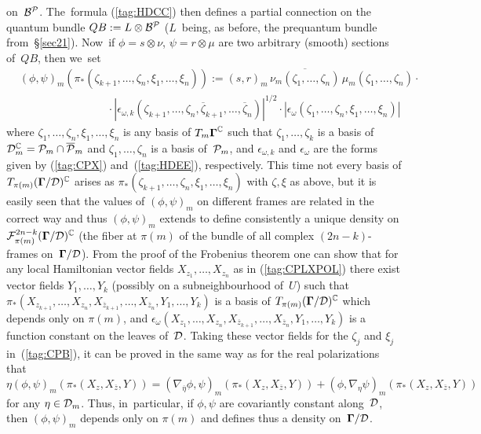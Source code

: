 \documentclass[12pt]{amsart}
\numberwithin{equation}{section}
\theoremstyle{remark}
\newcommand\Omg{{\bigam}}   %
\newcommand\FF{\Cal F}
\newcommand\PP{{\Cal P}}
\newcommand\DD{{\Cal D}}
\newcommand\MD{{\Omg/\DD}}
\newcommand\BB{\Cal B}
\newcommand{\CC}{\C}
\newcommand{\bigam}{\mbox{\boldmath $\Gamma$}}
\newcommand{\C}{\mathbb C}
\begin{document}
on~$\BB^\PP$. The~formula (\ref{tag:HDCC}) then defines a partial connection on
the quantum bundle $QB:=L\otimes\BB^\PP$ ($L$~being, as before, the prequantum
bundle from~\S\ref{sec21}). Now~if $\phi=s\otimes\nu$, $\psi=r\otimes\mu$ are
two arbitrary (smooth) sections of~$QB$, then we~set
\begin{equation}  \begin{aligned}
& (\phi,\psi)_m (\pi_*(\zeta_{k+1},\dots,\zeta_n,\xi_1,\dots,\xi_n)) :=
(s,r)_m\,\overline{\nu_m(\zeta_1,\dots,\zeta_n)}\,\mu_m(\zeta_1,\dots,\zeta_n)
\cdot{} \\ & \qquad\qquad\qquad\qquad {} \cdot
|\epsilon_{\omega,k}(\zeta_{k+1},\dots,\zeta_n,\overline\zeta_{k+1},\dots,
\overline\zeta_n)|^{1/2} \cdot |\epsilon_\omega(\zeta_1,\dots,\zeta_n,\xi_1,
\dots,\xi_n)|  \end{aligned}   \label{tag:CPB}  \end{equation}
where $\zeta_1,\dots,\zeta_n,\xi_1,\dots,\xi_n$ is any basis of $T_m\Omg^\CC$
such that $\zeta_1,\dots,\zeta_k$ is a basis of $\DD_m^\CC=\PP_m\cap\overline
\PP_m$ and $\zeta_1,\dots,\zeta_n$ is a basis of~$\PP_m$, and $\epsilon_
{\omega,k}$ and $\epsilon_\omega$ are the forms given by (\ref{tag:CPX})
and~(\ref{tag:HDEE}), respectively. This time not every basis of $T_{\pi(m)}
(\MD)^\CC$ arises as $\pi_*(\zeta_{k+1},\dots,\zeta_n,\xi_1,\dots,\xi_n)$ with
$\zeta,\xi$ as above, but it is easily seen that the values of $(\phi,\psi)_m$
on different frames are related in the correct way and thus $(\phi,\psi)_m$
extends to define consistently a unique density on $\FF^{2n-k}_{\pi(m)}(\MD)^
\CC$ (the fiber at $\pi(m)$ of the bundle of all complex $(2n-k)$-frames
on~$\MD$). From the proof of the Frobenius theorem one can show that for any
local Hamiltonian vector fields $X_{z_1},\dots,X_{z_n}$ as in
(\ref{tag:CPLXPOL}) there exist vector fields $Y_1,\dots,Y_k$ (possibly on a
subneighbourhood of~$U$) such that
$\pi_*(X_{z_{k+1}},\dots,X_{z_n},X_{\overline z_{k+1}},\dots,X_{\overline z_n},
Y_1,\dots,Y_k)$ is a basis of $T_{\pi(m)}(\MD)^\CC$ which depends only on
$\pi(m)$, and $\epsilon_\omega(X_{z_1},\dots,X_{z_n},X_{\overline z_{k+1}},
\dots,X_{\overline z_n},Y_1,\dots,Y_k)$ is a function constant on the leaves
of~$\DD$. Taking these vector fields for the $\zeta_j$ and $\xi_j$
in~(\ref{tag:CPB}), it can be proved in the same way as for the real
polarizations that
$$ \eta(\phi,\psi)_m(\pi_*(X_z,X_{\overline z},Y)) =
(\nabla_{\overline\eta} \phi,\psi)_m(\pi_*(X_z,X_{\overline z},Y)) +
(\phi,\nabla_\eta \psi)_m (\pi_*(X_z,X_{\overline z},Y))  $$
for any $\eta\in\DD_m$. Thus, in~particular, if $\phi,\psi$ are covariantly
constant along~$\DD$, then $(\phi,\psi)_m$ depends only on $\pi(m)$ and defines
thus a density on~$\MD$.
\end{document}
